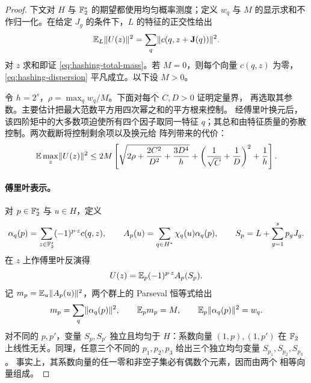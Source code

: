 \begin{proof}
下文对 $H$ 与 $\mathbb F_2^s$ 的期望都使用均匀概率测度；定义 $w_q$ 与 $M$
的显示求和不作归一化。在给定 $J_g$ 的条件下，$L$ 的特征的正交性给出
\[
 \mathbb E_L\lVert U(z)\rVert^2
 =\sum_q\lVert c(q,z+\mathbf J(q))\rVert^2.
\]
对 $z$ 求和即证 \eqref{eq:hashing-total-mass}。若 $M=0$，则每个向量
$c(q,z)$ 为零，\eqref{eq:hashing-dispersion} 平凡成立。以下设
$M>0$。

令 $h=2^s$，$\rho=\max_q w_q/M$。下面对每个 $C,D>0$ 证明定量界，
再选取其参数。主要估计把最大范数平方用四次幂之和的平方根来控制。
经傅里叶换元后，该四阶矩中的大多数项迫使所有四个因子取同一特征
$q$；其总和由特征质量的弥散控制。两次截断将控制剩余项以及换元给
阵列带来的代价：
\begin{equation}\label{eq:hashing-quantitative}
 \mathbb E\max_z\lVert U(z)\rVert^2
 \le 2M\left[
 \sqrt{2\rho+\frac{2C^2}{D^2}+\frac{3D^4}{h}}
 +\left(\frac1{\sqrt C}+\frac1D\right)^2+\frac1h
 \right].
\end{equation}


\paragraph{傅里叶表示。}
对 $p\in\mathbb F_2^s$ 与 $u\in H$，定义
\[
 \alpha_q(p)=\sum_{z\in\mathbb F_2^s}(-1)^{p\cdot z}c(q,z),
 \qquad
 A_p(u)=\sum_{q\in H^*}\chi_q(u)\alpha_q(p),
 \qquad
 S_p=L+\sum_{g=1}^s p_gJ_g.
\]
在 $z$ 上作傅里叶反演得
\begin{equation}\label{eq:hashing-inversion}
 U(z)=\mathbb E_p(-1)^{p\cdot z}A_p(S_p).
\end{equation}
记 $m_p=\mathbb E_u\lVert A_p(u)\rVert^2$，两个群上的 Parseval 恒等式给出
\begin{equation}\label{eq:hashing-parseval}
 m_p=\sum_q\lVert\alpha_q(p)\rVert^2,
 \qquad \mathbb E_p m_p=M,
 \qquad \mathbb E_p\lVert\alpha_q(p)\rVert^2=w_q.
\end{equation}
对不同的 $p,p'$，变量 $S_p,S_{p'}$ 独立且均匀于 $H$：系数向量
$(1,p),(1,p')$ 在 $\mathbb F_2$ 上线性无关。同理，任意三个不同的
$p_1,p_2,p_3$ 给出三个独立均匀变量 $S_{p_1},S_{p_2},S_{p_3}$。
事实上，其系数向量的任一零和非空子集必有偶数个元素，因而由两个
相等向量组成。


\end{proof}
